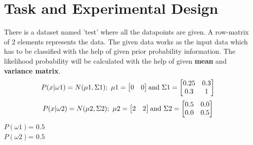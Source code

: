 \documentclass[conference]{IEEEtran}
\begin{document}
\section{Task and Experimental Design}

There is a dataset named 'test' where all the datapoints are given. A row-matrix of $2$ elements represents the data. The given data works as the input data which has to be classified with the help of given prior probability information. The likelihood probability will be calculated with the help of given \textbf{mean} and \textbf{variance matrix}.\\
\begin{equation}
P(x|\omega 1)=N(\mu 1, \Sigma 1);\textrm{   }\\
\mu 1= \begin{bmatrix}
0 & 0 \\
\end{bmatrix}\\
\textrm{and }
\Sigma 1= \begin{bmatrix}
0.25 & 0.3 \\
0.3 & 1
\end{bmatrix}\\
\end{equation}
\begin{equation}
P(x|\omega 2)=N(\mu 2, \Sigma 2);\textrm{   }\\
\mu 2= \begin{bmatrix}
2 & 2 \\
\end{bmatrix}\\
\textrm{and }
\Sigma 2= \begin{bmatrix}
0.5 & 0.0 \\
0.0 & 0.5
\end{bmatrix}\\
\end{equation}
	$P(\omega 1)$= $0.5$\\
	$P(\omega 2)$= $0.5$\\
\end{document}
